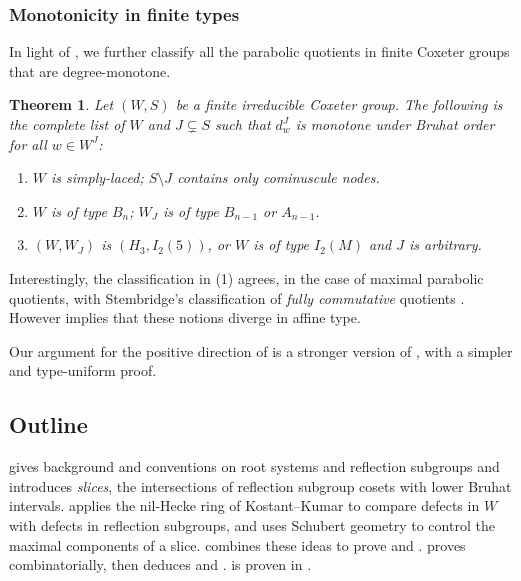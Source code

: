\documentclass[11pt]{amsart}
\newtheorem{theorem}{Theorem}[section]
\theoremstyle{definition}
\theoremstyle{remark}
\numberwithin{equation}{section}
\begin{document}
\subsubsection{Monotonicity in finite types}
In light of , we further classify all the parabolic quotients in finite Coxeter groups that are degree-monotone.
\begin{theorem}\label{thm:degree-monotone-finite-types}
Let $(W,S)$ be a finite irreducible Coxeter group. The following is the complete list of $W$ and $J \subsetneq S$ such that $d_w^J$ is monotone under Bruhat order for all $w \in W^J$:
\begin{enumerate}
\item $W$ is simply-laced; $S\setminus J$ contains only cominuscule nodes.
\item $W$ is of type $B_n$; $W_J$ is of type $B_{n-1}$ or $A_{n-1}$.
\item $(W,W_J)$ is $(H_3,I_2(5))$, or $W$ is of type $I_2(M)$ and $J$ is arbitrary. 
\end{enumerate}
\end{theorem}
Interestingly, the classification in (1) agrees, in the case of maximal parabolic quotients, with Stembridge's classification of \emph{fully commutative} quotients  \cite[Thm.~6.1]{stembridge-fullycommutative}. However  implies that these notions diverge in affine type.

Our argument for the positive direction of  is a stronger version of \cite[Thm.~1.4]{BG}, with a simpler and type-uniform proof. 

\subsection*{Outline}  gives background and conventions on root systems and reflection subgroups and introduces \emph{slices}, the intersections of reflection subgroup cosets with lower Bruhat intervals.  applies the nil-Hecke ring of Kostant--Kumar to compare defects in $W$ with defects in reflection subgroups, and
 uses Schubert geometry to control the maximal
components of a slice.  combines these ideas to prove  and  .  proves  combinatorially,
then deduces  and .  is proven in .
\end{document}
